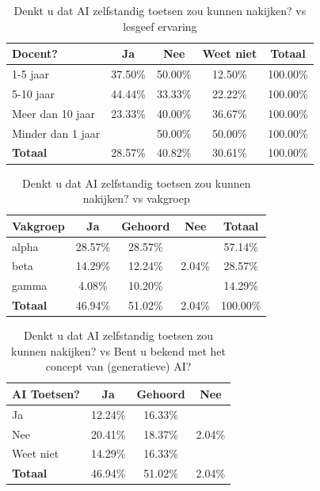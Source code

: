 \documentclass[12pt]{article}
\begin{document}
\noindent
\begin{table}[H]
\caption{Denkt u dat AI zelfstandig toetsen zou kunnen nakijken? vs lesgeef ervaring}
    \begin{tabular}{l c c c c}
        \toprule
        \textbf{Docent?} & \textbf{Ja} & \textbf{Nee} & \textbf{Weet niet} & \textbf{Totaal} \\
        \midrule
        1-5 jaar      & 37.50\% & 50.00\% & 12.50\% & 100.00\% \\
        5-10 jaar     & 44.44\% & 33.33\% & 22.22\% & 100.00\% \\
        Meer dan 10 jaar & 23.33\% & 40.00\% & 36.67\% & 100.00\% \\
        Minder dan 1 jaar &  & 50.00\% & 50.00\% & 100.00\% \\
        \midrule
        \textbf{Totaal} & 28.57\% & 40.82\% & 30.61\% & 100.00\% \\
        \bottomrule
    \end{tabular}
\end{table}

\noindent
\begin{table}[H]


    \caption{Denkt u dat AI zelfstandig toetsen zou kunnen nakijken? vs vakgroep}

    \begin{tabular}{l c c c c}
        \toprule
        \textbf{Vakgroep} & \textbf{Ja} & \textbf{Gehoord} & \textbf{Nee} & \textbf{Totaal} \\
        \midrule
        alpha & 28.57\% & 28.57\% &  & 57.14\% \\
        beta  & 14.29\% & 12.24\% & 2.04\% & 28.57\% \\
        gamma & 4.08\%  & 10.20\% &  & 14.29\% \\
        \midrule
        \textbf{Totaal} & 46.94\% & 51.02\% & 2.04\% & 100.00\% \\
        \bottomrule
    \end{tabular}
\end{table}

\noindent
\begin{table}[H]

    \caption{Denkt u dat AI zelfstandig toetsen zou kunnen nakijken? vs Bent u bekend met het concept van (generatieve) AI?}

    \begin{tabular}{l c c c}
        \toprule
        \textbf{AI Toetsen?} & \textbf{Ja} & \textbf{Gehoord} & \textbf{Nee} \\
        \midrule
        Ja      & 12.24\% & 16.33\% &  \\
        Nee     & 20.41\% & 18.37\% & 2.04\% \\
        Weet niet & 14.29\% & 16.33\% &  \\
        \midrule
        \textbf{Totaal} & 46.94\% & 51.02\% & 2.04\% \\
        \bottomrule
    \end{tabular}
\end{table}
\end{document}
